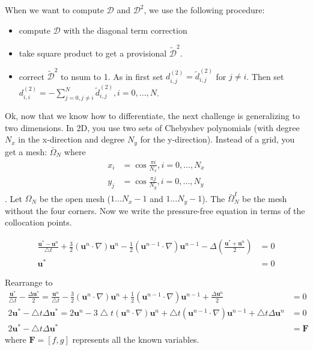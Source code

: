 \documentclass[12pt]{article}
\begin{document}
When we want to compute $\mathcal{D}$ and $\mathcal{D}^2$, we use the following procedure:
\begin{itemize}
    \item compute $\mathcal{D}$ with the diagonal term correction
    \item take square product to get a provisional $\tilde{\mathcal{D}}^2$.
    \item correct $\tilde{\mathcal{D}}^2$ to nsum to 1. As in first set $d^{(2)}_{i,j} = \tilde{d}^{(2)}_{i,j}$ for $j \neq i$. Then set $d^{(2)}_{i,i} = -\sum_{j=0, j\neq i}^{N} \tilde{d}^{(2)}_{i,j}, i = 0,..., N$.
\end{itemize}

Ok, now that we know how to differentiate, the next challenge is generalizing to two dimensions. In 2D, you use two sets of Chebyshev polynomials (with degree $N_x$ in the x-direction and degree $N_y$ for the y-direction). Instead of a grid, you get a mesh:
$\bar{\Omega}_N$ where
\begin{align*}
    x_i &= \cos \frac{\pi i}{N_x}, i = 0, ..., N_x \\
    y_j &= \cos \frac{\pi j}{N_y}, i = 0, ..., N_y
\end{align*}
. Let $\Omega_N$ be the open mesh ($1...N_x-1$ and $1...N_y-1$). The $\bar{\Omega}^I_N$ be the mesh without the four corners. Now we write the pressure-free equation in terms of the collocation points.

\begin{align*}
    \frac{\mathbf{u}^{*} - \mathbf{u}^n}{\bigtriangleup t} + \frac{3}{2}(\mathbf{u}^n \cdot \nabla)\mathbf{u}^n - \frac{1}{2}(\mathbf{u}^{n-1} \cdot \nabla)\mathbf{u}^{n-1} - \Delta(\frac{\mathbf{u}^{*} + \mathbf{u}^n}{2}) &= 0 \\
    \mathbf{u}^{*} &= 0
\end{align*}

Rearrange to
\begin{align*}
\frac{\mathbf{u}^*}{{\bigtriangleup t}} - \frac{\Delta \mathbf{u}^*}{2} = \frac{\mathbf{u}^n}{\bigtriangleup t} - \frac{3}{2}(\mathbf{u}^n \cdot \nabla)\mathbf{u}^n + \frac{1}{2}(\mathbf{u}^{n-1} \cdot \nabla)\mathbf{u}^{n-1} + \frac{\Delta \mathbf{u}^n}{2} &= 0 \\
2\mathbf{u}^* - \bigtriangleup t \Delta \mathbf{u}^* = 2\mathbf{u}^n - 3\bigtriangleup t(\mathbf{u}^n \cdot \nabla)\mathbf{u}^n + \bigtriangleup t(\mathbf{u}^{n-1} \cdot \nabla)\mathbf{u}^{n-1} + \bigtriangleup t\Delta \mathbf{u}^n &= 0 \\
2\mathbf{u}^* - \bigtriangleup t \Delta \mathbf{u}^* &= \mathbf{F}
\end{align*}
where $\mathbf{F} = [f, g]$ represents all the known variables.
\end{document}
